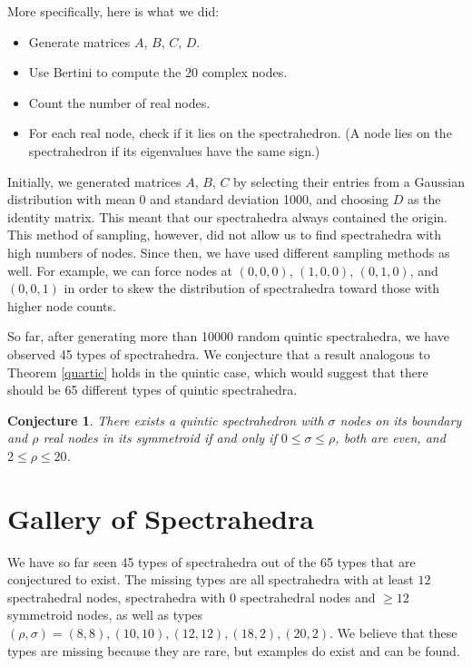 \documentclass[12pt]{amsart}
\theoremstyle{plain}
\newtheorem{conjecture}[theorem]{Conjecture}
\theoremstyle{definition}
\begin{document}
More specifically, here is what we did:
\begin{itemize}
	\item Generate matrices $A$, $B$, $C$, $D$.
	\item Use Bertini to compute the 20 complex nodes.
	\item Count the number of real nodes.
	\item For each real node, check if it lies on the spectrahedron. (A node
		lies on the spectrahedron if its eigenvalues have the same sign.)
\end{itemize}

Initially, we generated matrices $A$, $B$, $C$ by selecting their entries from
a Gaussian distribution with mean 0 and standard deviation 1000, and choosing
$D$ as the identity matrix. This meant that our spectrahedra always contained
the origin. This method of sampling, however, did not allow us to find
spectrahedra with high numbers of nodes. Since then, we have used different
sampling methods as well. For example, we can force nodes at $(0,0,0)$,
$(1,0,0)$, $(0,1,0)$, and $(0,0,1)$ in order to skew the distribution of
spectrahedra toward those with higher node counts.

So far, after generating more than 10000 random quintic spectrahedra, we have
observed 45 types of spectrahedra. 
We conjecture that a result analogous to Theorem \ref{quartic} holds in the
quintic case, which would suggest that there should be 65 different types of
quintic spectrahedra.
\begin{conjecture} 
	There exists a quintic spectrahedron with $\sigma$ nodes on its boundary and
	$\rho$ real nodes in its symmetroid if and only if $0 \le \sigma \le \rho$,
	both are even, and $2 \le \rho \le 20$.
\end{conjecture} 

\section{Gallery of Spectrahedra}

We have so far seen 45 types of spectrahedra out of the 65 types that are
conjectured to exist. The missing types are all spectrahedra with 
at least $12$ spectrahedral nodes, spectrahedra with $0$ spectrahedral nodes
and $\ge 12$ symmetroid nodes, as well as types 
$(\rho,\sigma) = (8,8), (10,10), (12,12), (18,2), (20,2)$.
We believe that these types are missing because they are rare, but examples do
exist and can be found.

\bigskip
\end{document}
